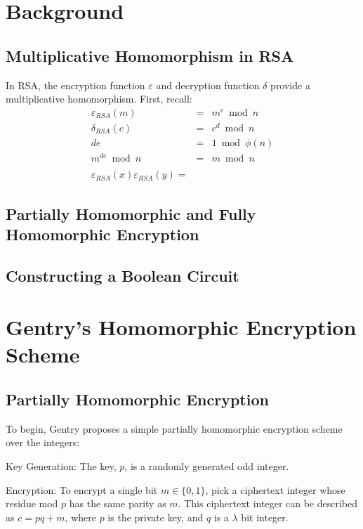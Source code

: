 \documentclass[a4paper,10pt]{article}
\begin{document}
\section{Background}

\subsection{Multiplicative Homomorphism in RSA}
In RSA, the encryption function $\varepsilon$ and decryption function $\delta$ provide a multiplicative homomorphism. First, recall:
\begin{eqnarray}
\varepsilon_{RSA}(m) &=& m^e \bmod n\\
\delta_{RSA}(c) &=& c^d \bmod n\\
de &=& 1 \bmod \phi(n)\\
m^{de} \bmod n &=& m \bmod n\\
\\
\varepsilon_{RSA}(x) \varepsilon_{RSA}(y) = 
\end{eqnarray}


\subsection{Partially Homomorphic and Fully Homomorphic Encryption}

\subsection{Constructing a Boolean Circuit}


\section{Gentry's Homomorphic Encryption Scheme}

\subsection{Partially Homomorphic Encryption}
To begin, Gentry proposes a simple partially homomorphic encryption
scheme over the integers:

Key Generation: The key, $p$, is a randomly generated odd integer.

Encryption: To encrypt a single bit $ m \in \{0,1\} $, pick a
ciphertext integer whose residue mod $ p $ has the same parity as
$m$. This ciphertext integer can be described as $ c = pq + m $, where
$ p $ is the private key, and $q$ is a $\lambda$ bit integer.
\end{document}
